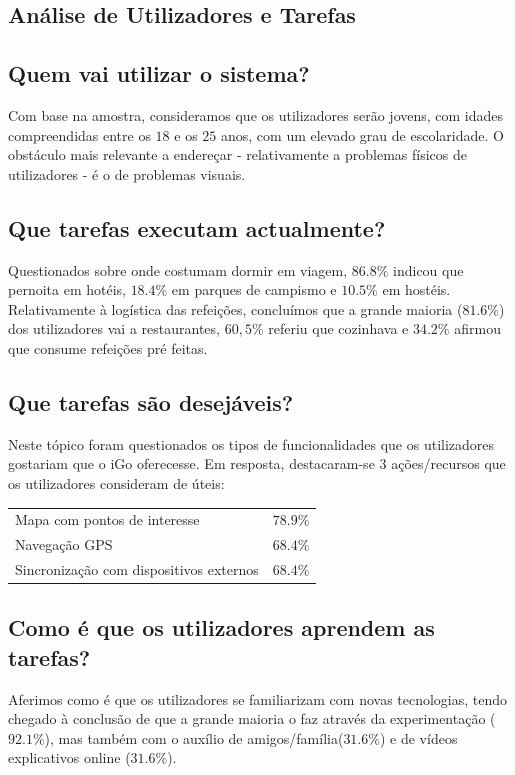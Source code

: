 \documentclass[a4paper]{article}
\begin{document}
\begin{multicols}{2}
  \section{Análise de Utilizadores e Tarefas}

  \subsection{Quem vai utilizar o sistema?}
  Com base na amostra, consideramos que os utilizadores serão jovens, com idades
  compreendidas entre os $18$ e os $25$ anos, com um elevado grau de escolaridade.
  O obstáculo mais relevante a endereçar - relativamente a problemas físicos de
  utilizadores - é o de problemas visuais.
  \subsection{Que tarefas executam actualmente?}
  Questionados sobre onde costumam dormir em viagem, $86.8\%$ indicou que pernoita
  em hotéis, $18.4\%$ em parques de campismo e $10.5\%$ em hostéis.
  Relativamente à logística das refeições, concluímos que a grande maioria
  ($81.6\%$) dos utilizadores vai a restaurantes, $60,5\%$ referiu que cozinhava e
  $34.2\%$ afirmou que consume refeições pré feitas.

  \subsection{Que tarefas são desejáveis?}
  Neste tópico foram questionados os tipos de funcionalidades que os utilizadores
  gostariam que o iGo oferecesse. Em resposta, destacaram-se $3$
  ações/recursos que os utilizadores consideram de úteis:
  \begin{tabular}{l  r}
    Mapa com pontos de interesse & $78.9\%$\\
    Navegação GPS & $68.4\%$\\
    Sincronização com dispositivos externos & $68.4\%$\\
  \end{tabular}

  \subsection{Como é que os utilizadores aprendem as tarefas?}
  Aferimos como é que os utilizadores se familiarizam com novas tecnologias, tendo
  chegado à conclusão de que a grande maioria o faz através da experimentação
  ($92.1\%$), mas também com o auxílio de amigos/família($31.6\%$) e de vídeos
  explicativos online ($31.6\%$).

\end{multicols}
\end{document}

